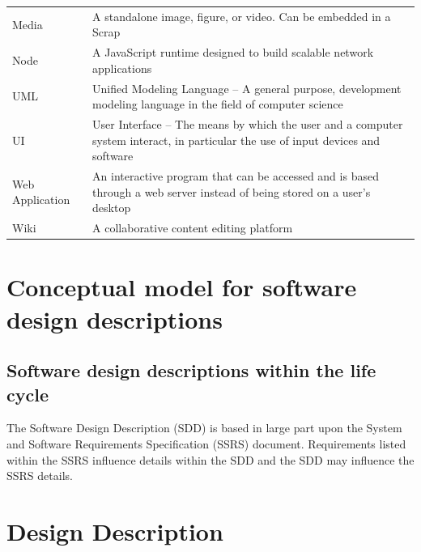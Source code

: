 \documentclass[letterpaper, 10pt, draftclsnofoot, compsoc, onecolumn]{IEEEtran}
\begin{document}
\begin{center}
\begin{supertabular}{p{3cm}p{12cm}}
Media & A standalone image, figure, or video. Can be embedded in a Scrap\\

Node & A JavaScript runtime designed to build scalable network applications\\ 

UML & Unified Modeling Language -- A general purpose, development modeling language in the field of computer science\\ 

UI  & User Interface -- The means by which the user and a computer system interact, 
	in particular the use of input devices and software\\

Web Application & An interactive program that can be accessed and is based through a web server instead of 
being stored on a user's desktop\\

Wiki & A collaborative content editing platform \\ 
\end{supertabular}

\end{center}



\section{Conceptual model for software design descriptions}



\subsection{Software design descriptions within the life cycle}
{\noindent The Software Design Description (SDD) is based in large part upon 
the System and Software Requirements Specification (SSRS) document. 
Requirements listed within the SSRS influence details within the SDD and 
the SDD may influence the SSRS details.\par}


\section{Design Description}
{\noindent \par}
\end{document}
